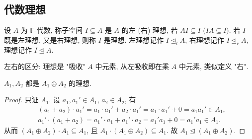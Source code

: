 \subsection{代数理想}

\begin{definition}[理想]\label{def:ideal}
设 $A$ 为 $\mathbb{F}$-代数, 称子空间 $I\subseteq A$ 是 $A$ 的左 (右) 理想, 若 $AI\subseteq I$ ($IA\subseteq I$).
若 $I$ 既是左理想, 又是右理想, 则称 $I$ 是理想.
左理想记作 $I\trianglelefteq_l A$, 右理想记作 $I\trianglelefteq_r A$, 理想记作 $I\trianglelefteq A$.
\end{definition}

左右的区分: 理想是 "吸收" $A$ 中元素, 从左吸收即在乘 $A$ 中元素, 类似定义 "右".

\begin{remark}\label{rem:summand-ideal}
$A_1,A_2$ 都是 $A_1\oplus A_2$ 的理想.
\end{remark}

\begin{proof}
只证 $A_1$. 设 $a_1,a_1'\in A_1$, $a_2\in A_2$, 有
\[\begin{aligned}
  &(a_1+a_2)\cdot a_1' = a_1\cdot a_1'+a_2\cdot a_1'=a_1\cdot a_1'+0=a_1a_1'\in A_1,\\
  &a_1'\cdot(a_1+a_2) = a_1'\cdot a_1+a_1'\cdot a_2=a_1'a_1+0=a_1'a_1\in A_1 .
\end{aligned}\]
从而 $(A_1\oplus A_2)\cdot A_1\subseteq A_1$, 且 $A_1\cdot(A_1\oplus A_2)\subseteq A_1$.
故 $A_1\trianglelefteq(A_1\oplus A_2)$.
\end{proof}

